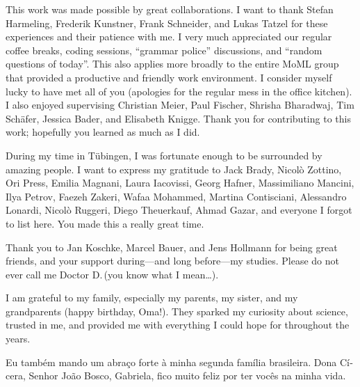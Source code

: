 This work was made possible by great collaborations. I want to thank Stefan
Harmeling, Frederik Kunstner, Frank Schneider, and Lukas Tatzel for these
experiences and their patience with me. I very much appreciated our regular
coffee breaks, coding sessions, ``grammar police'' discussions, and ``random
questions of today''.
This also applies more broadly to the entire MoML group that provided a
productive and friendly work environment. I consider myself lucky to have met
all of you
(apologies for the regular mess
in the office kitchen).
I also enjoyed supervising Christian Meier, Paul Fischer, Shrisha Bharadwaj, Tim
Sch\"afer, Jessica Bader, and Elisabeth Knigge. Thank you for contributing to
this work; hopefully you learned as much as I did.

During my time in T\"ubingen, I was fortunate enough to be surrounded by amazing
people. I want to express my gratitude to Jack Brady, Nicol\`o Zottino, Ori
Press, Emilia Magnani, Laura Iacovissi, Georg Hafner, Massimiliano Mancini, Ilya
Petrov, Faezeh Zakeri, Wafaa Mohammed, Martina Contisciani, Alessandro Lonardi,
Nicol\`o Ruggeri, Diego Theuerkauf, Ahmad Gazar, and everyone I forgot to list
here. You made this a really great time.

Thank you to Jan Koschke, Marcel Bauer, and Jens Hollmann for being great
friends, and your support during---and long before---my studies.
Please do not ever call me Doctor D.\,(you know what I mean\dots).

I am grateful to my family, especially my parents, my sister, and my
grandparents (happy birthday, Oma!). They sparked my curiosity about science,
trusted in me, and provided me with everything I could hope for throughout the
years.
\begin{otherlanguage}{portuguese}
  Eu tamb\'em mando um abra\c{c}o forte \`{a} minha segunda fam\'ilia
  brasileira. Dona C\'icera, Senhor Jo\~{a}o Bosco, Gabriela, fico muito feliz
  por ter voc\^{e}s na minha vida.
\end{otherlanguage}

